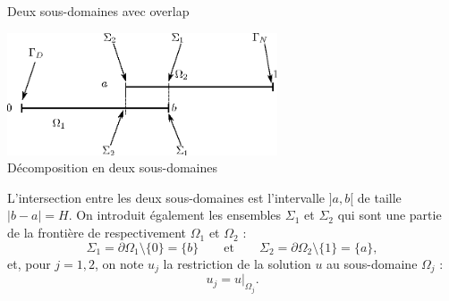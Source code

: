 \documentclass[
mode=present,    %
paper=a4paper,   %
orient=landscape,
display=slides,   %
size=10pt,
style=romain   %
]{powerdot}
\begin{document}
\begin{slide}[toc=]{Deux sous-domaines avec overlap}

\begin{center}
 \includegraphics[width=0.6\textwidth]{2dom.eps}\\[1em]
 Décomposition en deux sous-domaines
\end{center}

L'intersection entre les deux sous-domaines est l'intervalle $]a,b[$ de
taille $|b-a| = H$. On introduit également les ensembles $\Sigma_{1}$
et $\Sigma_{2}$ qui sont une partie de la frontière de respectivement
$\Omega_{1}$ et $\Omega_{2}$ :
$$
\Sigma_{1} = \partial\Omega_{1}\setminus\{0\} = \{b\}\qquad\text{et}\qquad
\Sigma_{2} = \partial\Omega_{2}\setminus\{1\} = \{a\},
$$
et, pour $j=1,2$, on note $u_{j}$ la restriction de la solution $u$ au
sous-domaine $\Omega_{j}$ :
$$
u_{j} = u|_{\Omega_{j}}.
$$

\end{slide}
\end{document}
